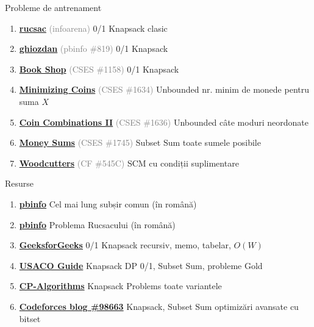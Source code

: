 \documentclass[10pt]{beamer}
\begin{document}
\begin{frame}{Probleme de antrenament}
  \begin{enumerate}\itemsep2pt\normalsize
    \item \href{https://www.infoarena.ro/problema/rucsac}{\textbf{rucsac}}
          \textcolor{gray}{(infoarena)} \textemdash{} 0/1 Knapsack clasic
    \item \href{https://www.pbinfo.ro/probleme/819/ghiozdan}{\textbf{ghiozdan}}
          \textcolor{gray}{(pbinfo \#819)} \textemdash{} 0/1 Knapsack
    \item \href{https://cses.fi/problemset/task/1158}{\textbf{Book Shop}}
          \textcolor{gray}{(CSES \#1158)} \textemdash{} 0/1 Knapsack
    \item \href{https://cses.fi/problemset/task/1634}{\textbf{Minimizing Coins}}
          \textcolor{gray}{(CSES \#1634)} \textemdash{} Unbounded \textemdash{} nr. minim de monede pentru suma $X$
    \item \href{https://cses.fi/problemset/task/1636}{\textbf{Coin Combinations II}}
          \textcolor{gray}{(CSES \#1636)} \textemdash{} Unbounded \textemdash{} câte moduri neordonate
    \item \href{https://cses.fi/problemset/task/1745}{\textbf{Money Sums}}
          \textcolor{gray}{(CSES \#1745)} \textemdash{} Subset Sum \textemdash{} toate sumele posibile
    \item \href{https://codeforces.com/problemset/problem/545/C}{\textbf{Woodcutters}}
          \textcolor{gray}{(CF \#545C)} \textemdash{} SCM cu condiții suplimentare
  \end{enumerate}
\end{frame}

\begin{frame}{Resurse}
  \begin{enumerate}\itemsep2pt\normalsize
    \item \href{https://www.pbinfo.ro/articole/22/cel-mai-lung-subsir-comun}{\textbf{pbinfo}}
          \textemdash{} Cel mai lung subșir comun (în română)
    \item \href{https://www.pbinfo.ro/articole/23/problema-rucsacului}{\textbf{pbinfo}}
          \textemdash{} Problema Rucsacului (în română)
    \item \href{https://www.geeksforgeeks.org/dsa/0-1-knapsack-problem-dp-10/}{\textbf{GeeksforGeeks}}
          \textemdash{} 0/1 Knapsack \textemdash{} recursiv, memo, tabelar, $O(W)$
    \item \href{https://usaco.guide/gold/knapsack}{\textbf{USACO Guide}}
          \textemdash{} Knapsack DP \textemdash{} 0/1, Subset Sum, probleme Gold
    \item \href{https://cp-algorithms.com/dynamic_programming/knapsack.html}{\textbf{CP-Algorithms}}
          \textemdash{} Knapsack Problems \textemdash{} toate variantele
    \item \href{https://codeforces.com/blog/entry/98663}{\textbf{Codeforces blog \#98663}}
          \textemdash{} Knapsack, Subset Sum \textemdash{} optimizări avansate cu bitset
  \end{enumerate}
\end{frame}
\end{document}
